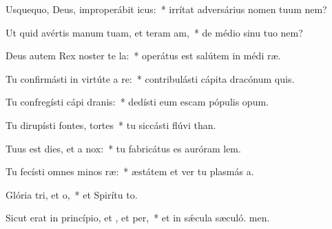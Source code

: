 \item Usquequo, Deus, improperábit icus:~* irrítat adversárius nomen tuum  nem?
\item Ut quid avértis manum tuam, et teram am,~* de médio sinu tuo  nem?
\item Deus autem Rex noster te la:~* operátus est salútem in médi ræ.
\item Tu confirmásti in virtúte a re:~* contribulásti cápita dracónum  quis.
\item Tu confregísti cápi dranis:~* dedísti eum escam pópulis opum.
\item Tu dirupísti fontes,  tortes~* tu siccásti flúvi than.
\item Tuus est dies, et a  nox:~* tu fabricátus es auróram  lem.
\item Tu fecísti omnes minos ræ:~* æstátem et ver tu plasmás a.
\item Glória tri, et o,~* et Spirítu to.
\item Sicut erat in princípio, et , et per,~* et in sǽcula sæculó. men.
